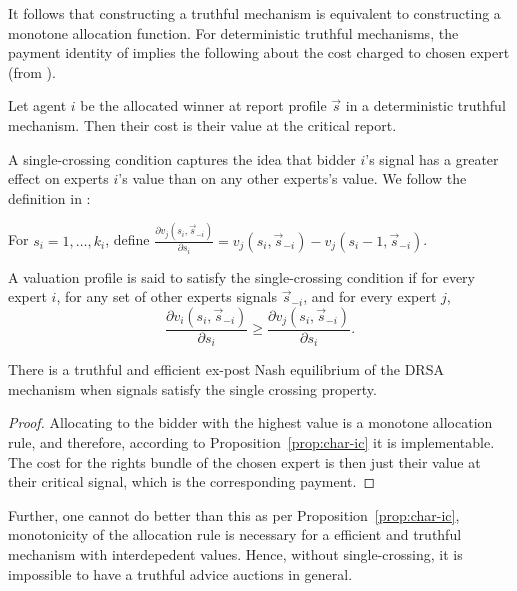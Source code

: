 It follows that constructing a truthful mechanism is equivalent to constructing a monotone allocation function.
For deterministic truthful mechanisms, the payment identity of \citet{roughgarden2016optimal} implies the following about the cost charged to chosen expert (from \cite{eden2018interdependent}).

\begin{prop}\label{prop:deterministic_payment}
	Let agent $i$ be the allocated winner at report profile $\vec{s}$ in a deterministic truthful mechanism. Then their cost is their value at the critical report.
\end{prop}


A single-crossing condition captures the idea that bidder $i$'s signal has a greater effect on experts $i$'s value than on any other experts's value. We follow the definition in \cite{eden2018interdependent}:

For $s_i = 1, \ldots, k_i$, define $\frac{\partial v_j(s_i, \vec{s}_{-i})}{\partial s_i} = v_j(s_i, \vec{s}_{-i}) - v_j(s_i - 1, \vec{s}_{-i})$.

\begin{defn}
	A valuation profile is said to satisfy the single-crossing condition if for every expert $i$, for any set of other experts  signals $\vec{s}_{-i}$, and for every expert $j$, $$\frac{\partial v_i(s_i, \vec{s}_{-i})}{\partial s_i} \geq \frac{\partial v_j(s_i, \vec{s}_{-i})}{\partial s_i}.$$
\end{defn}



\begin{thm}
	There is a truthful and efficient ex-post Nash equilibrium of the DRSA mechanism when signals satisfy the single crossing property.
\end{thm}

\begin{proof}
Allocating to the bidder with the highest value is a monotone allocation rule, and therefore, according to Proposition~\ref{prop:char-ic} it is implementable. The cost for the rights bundle of the chosen expert is then just their value at their critical signal, which is the corresponding payment.
\end{proof}

Further, one cannot do better than this as per Proposition~\ref{prop:char-ic}, monotonicity of the allocation rule is necessary for a efficient and truthful mechanism with interdepedent values. Hence, without single-crossing, it is impossible to have a truthful advice auctions in general.

